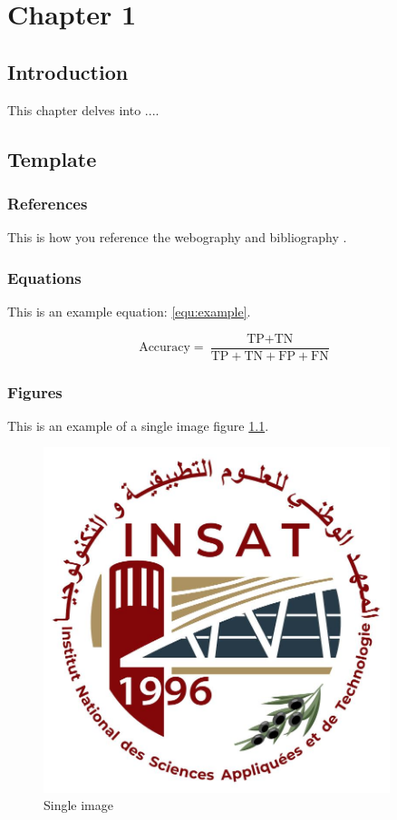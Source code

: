 \chapter{Chapter 1}
\minitoc
\label{chap:1st}
\section*{Introduction}
    This chapter delves into ....

\section{Template}
    \subsection{References}
        This is how you reference the webography \cite{web:insat} and bibliography \cite{ref:example}.
        
    \subsection{Equations}
        This is an example equation: \ref{equ:example}.

       \begin{equation}
            \text{Accuracy} = \frac{\text{TP} + \text{TN}}{\text{TP} + \text{TN} + \text{FP} + \text{FN}}
            \label{equ:example}
        \end{equation}


        

        
    \subsection{Figures}
        This is an example of a single image figure \ref{img:single}.

        \begin{figure}[htbp]
        \centerline{\includegraphics[width=0.9\textwidth]{images/INSAT.jpg}}
        \caption{Single image}
        \label{img:single}   
        \end{figure}


